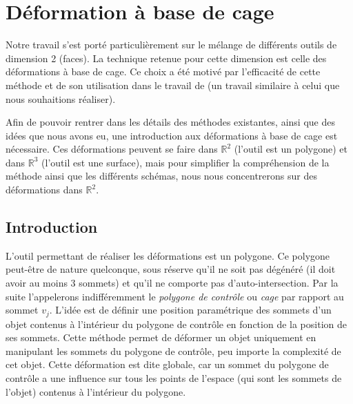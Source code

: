 

\chapter{Déformation à base de cage}

\graphicspath{ {Chapter2/Chapter2Figs/PNG/}
  {Chapter2/Chapter2Figs/PDF/} {Chapter2/Chapter2Figs/} }

Notre travail s'est porté particulièrement sur le mélange de différents outils
de dimension 2 (faces). La technique retenue pour cette dimension est celle
des déformations à base de cage. Ce choix a été motivé par l'efficacité de
cette méthode et de son utilisation dans le travail de \cite{GPCP13} (un
travail similaire à celui que nous souhaitions réaliser).

Afin de pouvoir rentrer dans les détails des méthodes existantes, ainsi que
des idées que nous avons eu, une introduction aux déformations à base de cage
est nécessaire. Ces déformations peuvent se faire dans $\mathbb{R}^2$ (l'outil
est un polygone) et dans $\mathbb{R}^3$ (l'outil est une surface), mais pour
simplifier la compréhension de la méthode ainsi que les différents schémas,
nous nous concentrerons sur des déformations dans $\mathbb{R}^2$.

\section{Introduction} 

L'outil permettant de réaliser les déformations est un polygone. Ce polygone
peut-être de nature quelconque, sous réserve qu'il ne soit pas dégénéré (il
doit avoir au moins 3 sommets) et qu'il ne comporte pas d'auto-intersection.
Par la suite l'appelerons indifféremment le \textit{polygone de contrôle} ou
\textit{cage} par rapport au sommet $v_j$. L'idée est de définir une position
paramétrique des sommets d'un objet contenus à l'intérieur du polygone de
contrôle en fonction de la position de ses sommets. Cette méthode permet de
déformer un objet uniquement en manipulant les sommets du polygone de
contrôle, peu importe la complexité de cet objet. Cette déformation est dite
globale, car un sommet du polygone de contrôle a une influence sur tous les
points de l'espace (qui sont les sommets de l'objet) contenus à l'intérieur du
polygone.


